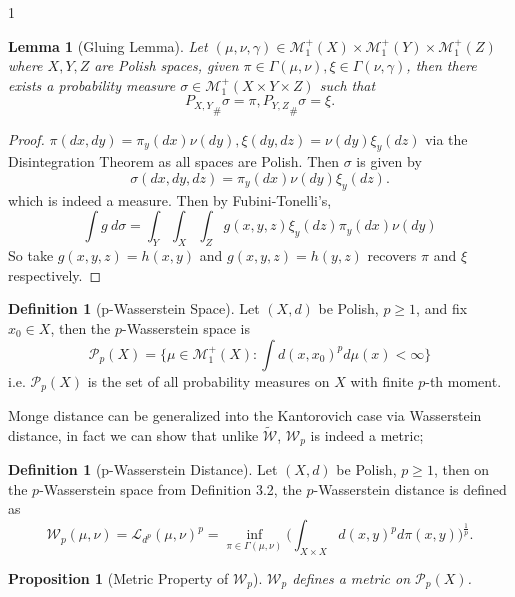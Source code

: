 \documentclass[12pt]{article}
\newtheorem{lemma}[theorem]{Lemma}
\newtheorem{proposition}[theorem]{Proposition}
\theoremstyle{definition}
\newtheorem{definition}[theorem]{Definition}
\theoremstyle{plain}
\begin{document}
\begin{spacing}{1}
{\begin{lemma}[Gluing Lemma]
    Let $(\mu, \nu, \gamma) \in \mathcal{M}_1^+(X) \times \mathcal{M}_1^+(Y) \times \mathcal{M}_1^+(Z)$ where $X, Y, Z$ are Polish spaces, given $\pi \in \Gamma(\mu, \nu), \xi \in \Gamma(\nu, \gamma)$, then there exists a probability measure $\sigma \in \mathcal{M}_1^+(X \times Y \times Z)$ such that 
    \[
    {P_{X, Y}}_\# \sigma = \pi, {P_{Y, Z}}_\# \sigma = \xi.
    \]
\end{lemma}

\begin{proof}
    $\pi(dx, dy) = \pi_y(dx)\nu(dy), \xi(dy, dz) = \nu(dy)\xi_y(dz)$ via the Disintegration Theorem as all spaces are Polish. Then $\sigma$ is given by 
    \[
    \sigma(dx, dy, dz) = \pi_y(dx)\nu(dy)\xi_y(dz).
    \]
    which is indeed a measure. Then by Fubini-Tonelli's,
    \[
    \displaystyle \int g \ d\sigma = \int_Y \int_X \int_Z g(x, y, z) \xi_y(dz) \pi_y(dx) \nu(dy)
    \]
    So take $g(x, y, z) = h(x, y)$ and $g(x, y, z) = h(y, z)$ recovers $\pi$ and $\xi$ respectively.
\end{proof}

\begin{definition}[p-Wasserstein Space]
    Let $(X, d)$ be Polish, $p \geq 1$, and fix $x_0 \in X$, then the $p$-Wasserstein space is
    \[
    \mathcal{P}_p(X) = \{\mu \in \mathcal{M}_1^+(X): \displaystyle \int d(x, x_0)^p d\mu(x) < \infty\}
    \]
    i.e. $\mathcal{P}_p(X)$ is the set of all probability measures on $X$ with finite $p$-th moment.
\end{definition}

Monge distance can be generalized into the Kantorovich case via Wasserstein distance, in fact we can show that unlike $\tilde{\mathcal{W}}$, $\mathcal{W}_p$ is indeed a metric;

\begin{definition}[p-Wasserstein Distance]
    Let $(X, d)$ be Polish, $p \geq 1$, then on the $p$-Wasserstein space from Definition 3.2, the $p$-Wasserstein distance is defined as
    \[
    \mathcal{W}_p(\mu, \nu) = \mathcal{L}_{d^p}(\mu, \nu)^p = \inf_{\pi \in \Gamma(\mu, \nu)} \bigg (\displaystyle \int_{X \times X} d(x, y)^p d\pi(x, y)\bigg )^\frac{1}{p}.
    \]
\end{definition}

\begin{proposition}[Metric Property of $\mathcal{W}_p$]
    $\mathcal{W}_p$ defines a metric on $\mathcal{P}_p(X)$.
\end{proposition}

}
\end{spacing}
\end{document}
